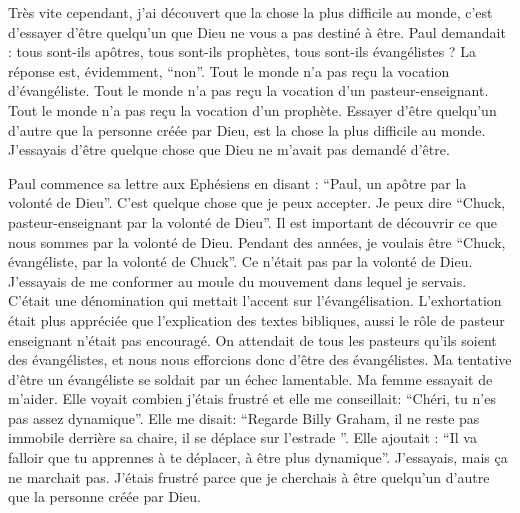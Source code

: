 Très vite cependant, j'ai découvert que la chose la plus difficile au monde, c’est d’essayer d’être quelqu'un que Dieu
ne vous a pas destiné à être. Paul demandait : tous sont-ils apôtres, tous sont-ils prophètes, tous sont-ils évangélistes
? La réponse est, évidemment, “non”. Tout le monde n’a pas reçu la vocation d’évangéliste. Tout le monde n’a pas
reçu la vocation d’un pasteur-enseignant. Tout le monde n’a pas reçu la vocation d’un prophète. Essayer d’être
quelqu'un d'autre que la personne créée par Dieu, est la chose la plus difficile au monde. J’essayais d’être quelque
chose que Dieu ne m’avait pas demandé d'être.

Paul commence sa lettre aux Ephésiens en disant : “Paul, un apôtre par la volonté de Dieu”. C'est quelque chose que
je peux accepter. Je peux dire
“Chuck, pasteur-enseignant par la volonté de Dieu”. Il est important de découvrir ce que nous sommes par la volonté
de Dieu. Pendant des années, je voulais être “Chuck, évangéliste, par la volonté de Chuck”. Ce n’était pas par la
volonté de Dieu. J’essayais de me conformer au moule du mouvement dans lequel je servais. C’était une
dénomination qui mettait l'accent sur l’évangélisation. L’exhortation était plus appréciée que l’explication des textes
bibliques, aussi le rôle de pasteur enseignant n'était pas encouragé. On attendait de tous les pasteurs qu'ils soient des
évangélistes, et nous nous efforcions donc d’être des évangélistes. Ma tentative d'être un évangéliste se soldait par
un échec lamentable. Ma femme essayait de m’aider. Elle voyait combien j'étais frustré et elle me conseillait: “Chéri,
tu n’es pas assez dynamique”. Elle me disait: “Regarde Billy Graham, il ne reste pas immobile derrière sa chaire, il se
déplace sur l'estrade ”. Elle ajoutait : “Il va falloir que tu apprennes à te déplacer, à être plus dynamique”. J’essayais,
mais ça ne marchait pas. J’étais frustré parce que je cherchais à être quelqu'un d'autre que la personne créée par
Dieu.

